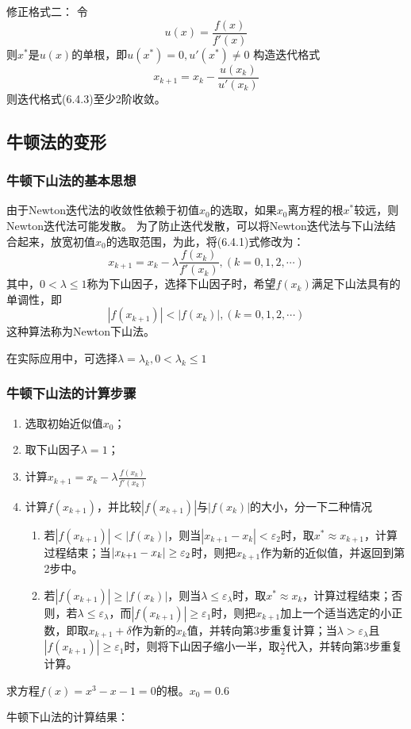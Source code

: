 修正格式二：
令
\[u(x) = \frac{f(x)}{f'(x)}\]
则$x^*$是$u(x)$的单根，即$u(x^*) = 0,u'(x^*) \neq 0$
构造迭代格式
\begin{equation}
    x_{k+1} = x_k-\frac{u(x_k)}{u'(x_k)}
\end{equation}
则迭代格式(6.4.3)至少2阶收敛。


\subsection{牛顿法的变形}

\subsubsection{牛顿下山法的基本思想}
由于Newton迭代法的收敛性依赖于初值$x_0$的选取，如果$x_0$离方程的根$x^*$较远，则Newton迭代法可能发散。
为了防止迭代发散，可以将Newton迭代法与下山法结合起来，放宽初值$x_0$的选取范围，为此，将(6.4.1)式修改为：
\begin{equation*}
    x_{k+1} = x_k-\lambda\frac{f(x_k)}{f'(x_k)},(k=0,1,2,\cdots)
\end{equation*}
其中，$0 < \lambda \leq 1$称为下山因子，选择下山因子时，希望$f(x_k)$满足下山法具有的单调性，即
\begin{equation*}
    |f(x_{k+1})| < |f(x_k)|,(k = 0,1,2,\cdots)
\end{equation*}
这种算法称为Newton下山法。

在实际应用中，可选择$\lambda = \lambda_k,0<\lambda_k \leq 1$

\subsubsection{牛顿下山法的计算步骤}
\begin{enumerate}
    \item 选取初始近似值$x_0$；
    \item 取下山因子$\lambda = 1$；
    \item 计算$x_{k+1} = x_k -\lambda\frac{f(x_k)}{f'(x_k)}$
    \item 计算$f(x_{k+1})$，并比较$|f(x_{k+1})|$与$|f(x_k)|$的大小，分一下二种情况
    
    \begin{enumerate}
        \item 若$|f(x_{k+1})| < |f(x_k)|$，则当$|x_{k+1}-x_k| < \varepsilon_2$时，取$x^* \approx x_{k+1}$，计算过程结束；当$\abs{x_{k+1}-x_k} \geq \varepsilon_2$时，则把$x_{k+1}$作为新的近似值，并返回到第2步中。
        \item 若$|f(x_{k+1})| \geq |f(x_k)|$，则当$\lambda \leq \varepsilon_\lambda$时，取$x^* \approx x_{k}$，计算过程结束；否则，若$\lambda \leq \varepsilon_\lambda$，而$|f(x_{k+1})| \geq \varepsilon_1$时，则把$x_{k+1}$加上一个适当选定的小正数，即取$x_{k+1}+\delta$作为新的$x_k$值，并转向第3步重复计算；当$\lambda > \varepsilon_\lambda$且$|f(x_{k+1})| \geq \varepsilon_1$时，则将下山因子缩小一半，取$\frac{\lambda}{2}$代入，并转向第3步重复计算。
    \end{enumerate}
\end{enumerate}

\begin{example}
    求方程$f(x) = x^3-x-1 = 0$的根。$x_0 = 0.6$
    \begin{solution}
        牛顿下山法的计算结果：%
    \end{solution}
\end{example}